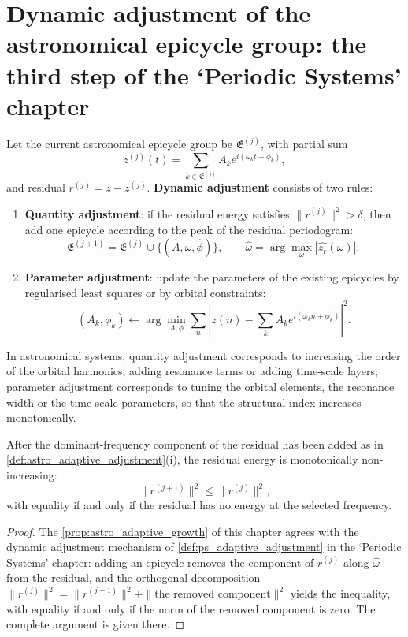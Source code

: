 \section{Dynamic adjustment of the astronomical epicycle group: the third step of the `Periodic Systems' chapter}
\label{sec:astro_adaptive}

\begin{definition}\label{def:astro_adaptive_adjustment}
Let the current astronomical epicycle group be \(\mathfrak E^{(j)}\), with partial sum
\[
z^{(j)}(t)=\sum_{k\in\mathfrak E^{(j)}}A_k e^{i(\omega_k t+\phi_k)},
\]
and residual \(r^{(j)}=z-z^{(j)}\). \textbf{Dynamic adjustment} consists of two rules:
\begin{enumerate}[label=(\roman*)]
    \item \textbf{Quantity adjustment}: if the residual energy satisfies \(\|r^{(j)}\|^2>\delta\), then add one epicycle according to the peak of the residual periodogram:
    \[
    \mathfrak E^{(j+1)}=\mathfrak E^{(j)}\cup\{(\hat A,\hat\omega,\hat\phi)\},\qquad
    \hat\omega=\arg\max_\omega|\widehat{z_r}(\omega)|;
    \]
    \item \textbf{Parameter adjustment}: update the parameters of the existing epicycles by regularised least squares or by orbital constraints:
    \[
    (A_k,\phi_k)\leftarrow\arg\min_{A,\phi}\sum_n\left|z(n)-\sum_kA_ke^{i(\omega_kn+\phi_k)}\right|^2.
    \]
\end{enumerate}
In astronomical systems, quantity adjustment corresponds to increasing the order of the orbital harmonics, adding resonance terms or adding time-scale layers; parameter adjustment corresponds to tuning the orbital elements, the resonance width or the time-scale parameters, so that the structural index increases monotonically.
\end{definition}

\begin{proposition}\label{prop:astro_adaptive_growth}
After the dominant-frequency component of the residual has been added as in \cref{def:astro_adaptive_adjustment}(i), the residual energy is monotonically non-increasing:
\[
\|r^{(j+1)}\|^2\le\|r^{(j)}\|^2,
\]
with equality if and only if the residual has no energy at the selected frequency.
\end{proposition}

\begin{proof}
The \cref{prop:astro_adaptive_growth} of this chapter agrees with the dynamic adjustment mechanism of \cref{def:ps_adaptive_adjustment} in the `Periodic Systems' chapter:
adding an epicycle removes the component of $r^{(j)}$ along $\hat\omega$ from the residual, and the orthogonal decomposition
$\|r^{(j)}\|^2=\|r^{(j+1)}\|^2+\|\text{the removed component}\|^2$ yields the inequality,
with equality if and only if the norm of the removed component is zero. The complete argument is given there.
\end{proof}

